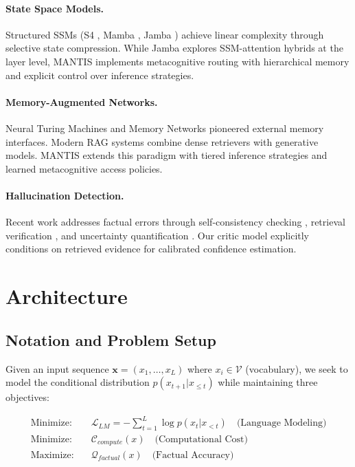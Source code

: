 \documentclass{article}
\begin{document}
\paragraph{State Space Models.} Structured SSMs (S4 \cite{gu2022s4}, Mamba \cite{gu2023mamba}, Jamba \cite{lieber2024jamba}) achieve linear complexity through selective state compression. While Jamba explores SSM-attention hybrids at the layer level, MANTIS implements metacognitive routing with hierarchical memory and explicit control over inference strategies.

\paragraph{Memory-Augmented Networks.} Neural Turing Machines \cite{graves2014ntm} and Memory Networks \cite{weston2014memory} pioneered external memory interfaces. Modern RAG systems \cite{lewis2020retrieval,izacard2021atlas} combine dense retrievers with generative models. MANTIS extends this paradigm with tiered inference strategies and learned metacognitive access policies.

\paragraph{Hallucination Detection.} Recent work addresses factual errors through self-consistency checking \cite{manakul2023selfcheckgpt}, retrieval verification \cite{gao2023rarr}, and uncertainty quantification \cite{kuhn2023semantic}. Our critic model explicitly conditions on retrieved evidence for calibrated confidence estimation.

\section{Architecture}

\subsection{Notation and Problem Setup}

Given an input sequence $\mathbf{x} = (x_1, \ldots, x_L)$ where $x_i \in \mathcal{V}$ (vocabulary), we seek to model the conditional distribution $p(x_{t+1} | x_{\leq t})$ while maintaining three objectives:

\begin{align}
\text{Minimize:} \quad & \mathcal{L}_{LM} = -\sum_{t=1}^{L} \log p(x_t | x_{<t}) \quad \text{(Language Modeling)} \\
\text{Minimize:} \quad & \mathcal{C}_{compute}(x) \quad \text{(Computational Cost)} \\
\text{Maximize:} \quad & \mathcal{Q}_{factual}(x) \quad \text{(Factual Accuracy)}
\end{align}
\end{document}
